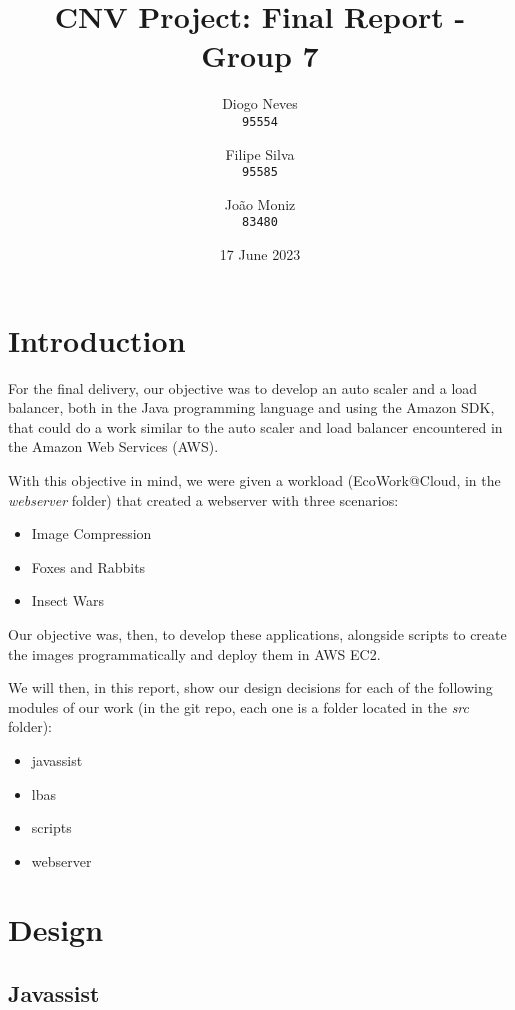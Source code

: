 \documentclass{article}
\date{17 June 2023}
\title{CNV Project: Final Report - Group 7}
\author{
    Diogo Neves \\
    \texttt{95554}
    \and
    Filipe Silva \\
    \texttt{95585}
    \and
    João Moniz \\
    \texttt{83480}
}
\begin{document}
\setcounter{page}{0}

\maketitle

\twocolumn

\section{Introduction}

For the final delivery, our objective was to develop an auto scaler and a load
balancer, both in the Java programming language and using the Amazon SDK, that
could do a work similar to the auto scaler and load balancer encountered in the
Amazon Web Services (AWS).

With this objective in mind, we were given a workload (EcoWork@Cloud, in the
\textit{webserver} folder) that created a webserver with three scenarios:

\begin{itemize}
    \item Image Compression
    \item Foxes and Rabbits
    \item Insect Wars
\end{itemize}

Our objective was, then, to develop these applications, alongside scripts to
create the images programmatically and deploy them in AWS EC2.

We will then, in this report, show our design decisions for each of the
following modules of our work (in the git repo, each one is a folder located in
the \textit{src} folder):

\begin{itemize}
    \item javassist
    \item lbas
    \item scripts
    \item webserver
\end{itemize}

\section{Design}

\subsection{Javassist}
\end{document}
